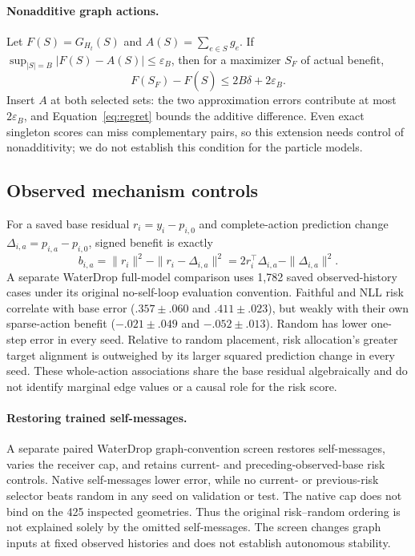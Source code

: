 \paragraph{Nonadditive graph actions.}\label{sec:nonadditive-allocation}
Let $F(S)=G_{H_t}(S)$ and $A(S)=\sum_{e\in S}g_e$. If
$\sup_{|S|=B}|F(S)-A(S)|\le\varepsilon_B$, then for a maximizer $S_F$ of actual benefit,
\begin{equation}
 F(S_F)-F(\widehat S)\le2B\delta+2\varepsilon_B.
 \label{eq:nonadditive-regret}
\end{equation}
Insert $A$ at both selected sets: the two approximation errors contribute at most $2\varepsilon_B$, and Equation~\ref{eq:regret} bounds the additive difference. Even exact singleton scores can miss complementary pairs, so this extension needs control of nonadditivity; we do not establish this condition for the particle models.

\subsection{Observed mechanism controls}
\label{sec:actual-action-benefit}
For a saved base residual $r_i=y_i-p_{i,0}$ and complete-action prediction change $\Delta_{i,a}=p_{i,a}-p_{i,0}$, signed benefit is exactly
\begin{equation}
 b_{i,a}=\|r_i\|^2-\|r_i-\Delta_{i,a}\|^2
        =2r_i^\top\Delta_{i,a}-\|\Delta_{i,a}\|^2.
\end{equation}
A separate WaterDrop full-model comparison uses 1,782 saved observed-history cases under its original no-self-loop evaluation convention. Faithful and NLL risk correlate with base error ($.357\pm.060$ and $.411\pm.023$), but weakly with their own sparse-action benefit ($-.021\pm.049$ and $-.052\pm.013$). Random has lower one-step error in every seed. Relative to random placement, risk allocation's greater target alignment is outweighed by its larger squared prediction change in every seed. These whole-action associations share the base residual algebraically and do not identify marginal edge values or a causal role for the risk score.

\paragraph{Restoring trained self-messages.}\label{sec:graph-bridge}
A separate paired WaterDrop graph-convention screen restores self-messages, varies the receiver cap, and retains current- and preceding-observed-base risk controls. Native self-messages lower error, while no current- or previous-risk selector beats random in any seed on validation or test. The native cap does not bind on the 425 inspected geometries. Thus the original risk--random ordering is not explained solely by the omitted self-messages. The screen changes graph inputs at fixed observed histories and does not establish autonomous stability. 

